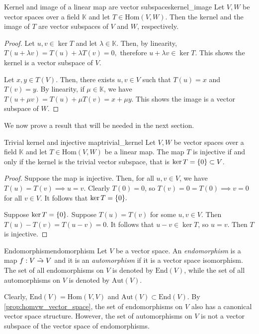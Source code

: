 \begin{proposition}{Kernel and image of a linear map are vector subspaces}{kernel_image}
    Let \(V, W\) be vector spaces over a field \(\mathbb{K}\) and let \(T \in \mathrm{Hom}(V,W)\). Then the kernel and the image of \(T\) are vector subspaces of \(V\) and \(W\), respectively.
\end{proposition}
\begin{proof}
    Let \(u, v \in \ker T\) and let \(\lambda \in \mathbb{K}\). Then, by linearity, \(T(u + \lambda v) = T(u) + \lambda T(v) = 0,\) therefore \(u + \lambda v \in \ker T\). This shows the kernel is a vector subspace of \(V\).

    Let \(x, y \in T(V)\). Then, there exists \(u, v \in V\) such that \(T(u) = x\) and \(T(v) = y\). By linearity, if \(\mu \in \mathbb{K}\), we have \(T(u + \mu v) = T(u) + \mu T(v) = x + \mu y\). This shows the image is a vector subspace of \(W\).
\end{proof}

We now prove a result that will be needed in the next section.
\begin{lemma}{Trivial kernel and injective map}{trivial_kernel}
    Let \(V, W\) be vector spaces over a field \(\mathbb{K}\) and let \(T\in\mathrm{Hom}(V,W)\) be a linear map. The map \(T\) is injective if and only if the kernel is the trivial vector subspace, that is \(\ker T = \{0\} \subset V\).
\end{lemma}
\begin{proof}
    Suppose the map is injective. Then, for all \(u, v \in V\), we have \(T(u) = T(v) \implies u = v\). Clearly \(T(0) = 0\), so \(T(v) = 0 = T(0) \implies v = 0\) for all \(v \in V\). It follows that \(\ker T = \{0\}.\)

    Suppose \(\ker T = \{0\}.\) Suppose \(T(u) = T(v)\) for some \(u, v \in V\). Then \(T(u) - T(v) = T(u-v) = 0\). It follows that \(u - v \in \ker T\), so \(u = v\). Then \(T\) is injective.
\end{proof}

\begin{definition}{Endomorphism}{endomorphism}
    Let \(V\) be a vector space. An \emph{endomorphism} is a map \(f : V \mathrel{\tilde{\to}} V\) and it is an \emph{automorphism} if it is a vector space isomorphism. The set of all endomorphisms on \(V\) is denoted by \(\mathrm{End}(V)\), while the set of all automorphisms on \(V\) is denoted by \(\mathrm{Aut}(V)\).
\end{definition}
\begin{remark}
    Clearly, \(\mathrm{End}(V) = \mathrm{Hom}(V,V)\) and \(\mathrm{Aut}(V) \subset \mathrm{End}(V)\). By \cref{prop:homvw_vector_space}, the set of endomorphisms on \(V\) also has a canonical vector space structure. However, the set of automorphisms on \(V\) is not a vector subspace of the vector space of endomorphisms.
\end{remark}

